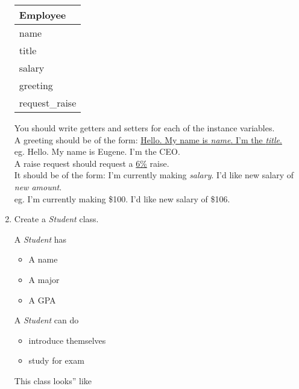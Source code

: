\documentclass{article}
\newcommand{\tab}{\hspace*{0.25in}}
\newcommand{\csq}[1]{\reflectbox{''}#1''}  %
\begin{document}
\begin{enumerate}
\begin{minipage}{.4\textwidth}
		\vspace*{1em}
		\begin{tabular}{|l|}
			\hline Employee\\ \hline
			name\\ title\\ salary\\ \hline
			greeting\\ request\_raise \\  \hline
		\end{tabular}
	\end{minipage}

	\vspace*{2ex}
	You should write getters and setters for each of the instance variables.\\

	A greeting should be of the form: \underline{Hello.  My name is \textit{name}.  
	I'm the \textit{title}.}\\
	\tab \tab eg. Hello.  My name is Eugene.  I'm the CEO.\\

	A raise request should request a \underline{6\%} raise.\\  It should be of the form: 
	I'm currently making \textit{salary}.  I'd like new salary of \textit{new amount}.\\
	\tab \tab eg. I'm currently making \$100.  I'd like new salary of \$106.\\




	\item Create a \textit{Student} class.\\
	\begin{minipage}{.6\textwidth}		
		A \textit{Student} has
		\begin{itemize}
			\item A name
			\item A major
			\item A GPA	
		\end{itemize}
	
		A \textit{Student} can do
		\begin{itemize}
			\item introduce themselves
			\item study for exam
		\end{itemize}
	\end{minipage} 
	\begin{minipage}{.4\textwidth}
		This class \csq{looks} like
		 

\end{minipage}
\end{enumerate}
\end{document}

